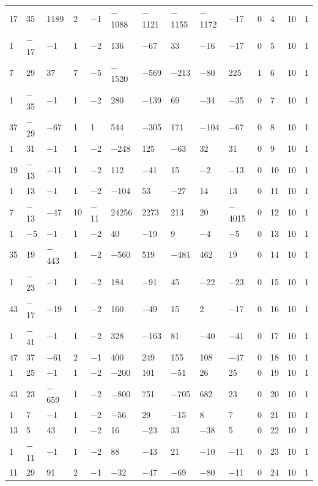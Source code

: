 \documentclass[pdftex]{sigma}
\numberwithin{equation}{section}
\theoremstyle{definition}
\numberwithin{table}{section}
\begin{document}
{\begin{paracol}{3}
\begin{supertabular}{|w{c}{.32cm}w{c}{.32cm}w{c}{.32cm}@{\hspace{.5cm}}w{c}{.2cm}w{c}{.2cm}|@{\hspace{\tabcolsep}}HHHHHHw{c}{.17cm}w{c}{.17cm}w{c}{.17cm}|}
			17 & 35 & 1189 & 2 & $-$1 & $-$1088 & $-$1121 & $-$1155 & $-$1172 & $-$17 & 0 & 4 & 10 & 1 \\
			1 & $-$17 & $-$1 & 1 & $-$2 & 136 & $-$67 & 33 & $-$16 & $-$17 & 0 & 5 & 10 & 1 \\
			7 & 29 & 37 & 7 & $-$5 & $-$1520 & $-$569 & $-$213 & $-$80 & 225 & 1 & 6 & 10 & 1 \\
			1 & $-$35 & $-$1 & 1 & $-$2 & 280 & $-$139 & 69 & $-$34 & $-$35 & 0 & 7 & 10 & 1 \\
			37 & $-$29 & $-$67 & 1 & 1 & 544 & $-$305 & 171 & $-$104 & $-$67 & 0 & 8 & 10 & 1 \\
			1 & 31 & $-$1 & 1 & $-$2 & $-$248 & 125 & $-$63 & 32 & 31 & 0 & 9 & 10 & 1 \\
			19 & $-$13 & $-$11 & 1 & $-$2 & 112 & $-$41 & 15 & $-$2 & $-$13 & 0 & 10 & 10 & 1 \\
			1 & 13 & $-$1 & 1 & $-$2 & $-$104 & 53 & $-$27 & 14 & 13 & 0 & 11 & 10 & 1 \\
			7 & $-$13 & $-$47 & 10 & $-$11 & 24256 & 2273 & 213 & 20 & $-$4015 & 0 & 12 & 10 & 1 \\
			1 & $-$5 & $-$1 & 1 & $-$2 & 40 & $-$19 & 9 & $-$4 & $-$5 & 0 & 13 & 10 & 1 \\
			35 & 19 & $-$443 & 1 & $-$2 & $-$560 & 519 & $-$481 & 462 & 19 & 0 & 14 & 10 & 1 \\
			1 & $-$23 & $-$1 & 1 & $-$2 & 184 & $-$91 & 45 & $-$22 & $-$23 & 0 & 15 & 10 & 1 \\
			43 & $-$17 & $-$19 & 1 & $-$2 & 160 & $-$49 & 15 & 2 & $-$17 & 0 & 16 & 10 & 1 \\
			1 & $-$41 & $-$1 & 1 & $-$2 & 328 & $-$163 & 81 & $-$40 & $-$41 & 0 & 17 & 10 & 1 \\
			47 & 37 & $-$61 & 2 & $-$1 & 400 & 249 & 155 & 108 & $-$47 & 0 & 18 & 10 & 1 \\
			1 & 25 & $-$1 & 1 & $-$2 & $-$200 & 101 & $-$51 & 26 & 25 & 0 & 19 & 10 & 1 \\
			43 & 23 & $-$659 & 1 & $-$2 & $-$800 & 751 & $-$705 & 682 & 23 & 0 & 20 & 10 & 1 \\
			1 & 7 & $-$1 & 1 & $-$2 & $-$56 & 29 & $-$15 & 8 & 7 & 0 & 21 & 10 & 1 \\
			13 & 5 & 43 & 1 & $-$2 & 16 & $-$23 & 33 & $-$38 & 5 & 0 & 22 & 10 & 1 \\
			1 & $-$11 & $-$1 & 1 & $-$2 & 88 & $-$43 & 21 & $-$10 & $-$11 & 0 & 23 & 10 & 1 \\
			11 & 29 & 91 & 2 & $-$1 & $-$32 & $-$47 & $-$69 & $-$80 & $-$11 & 0 & 24 & 10 & 1 \\

\end{supertabular}
\end{paracol}}
\end{document}
